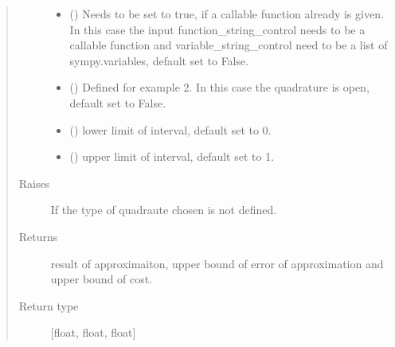\documentclass[letterpaper,10pt,english]{sphinxmanual}
\begin{document}
\begin{fulllineitems}
\begin{quote}
\begin{description}
\begin{itemize}
\item {} 
 (\sphinxstyleliteralemphasis{\sphinxupquote{, }}) \textendash{} Needs to be set to true, if a callable function already is given.
In this case the input function\_string\_control needs to be a callable function and variable\_string\_control
need to be a list of sympy.variables, default set to False.

\item {} 
 (\sphinxstyleliteralemphasis{\sphinxupquote{, }}) \textendash{} Defined for example 2. In this case the quadrature is open, default set to False.

\item {} 
 (\sphinxstyleliteralemphasis{\sphinxupquote{, }}) \textendash{} lower limit of interval, default set to 0.

\item {} 
 (\sphinxstyleliteralemphasis{\sphinxupquote{, }}) \textendash{} upper limit of interval, default set to 1.

\end{itemize}

\item[{Raises}] \leavevmode
{} \textendash{} If the type of quadraute chosen is not defined.

\item[{Returns}] \leavevmode
result of approximaiton, upper bound of error of approximation and upper bound of cost.

\item[{Return type}] \leavevmode
{[}float, float, float{]}

\end{description}\end{quote}

\end{fulllineitems}

\end{document}
